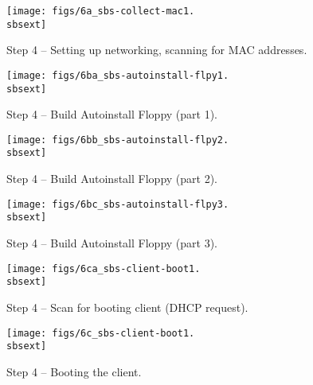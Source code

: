 
\begin{figure}[htbp]
  \begin{center}
    \texttt{[image: figs/6a\_sbs-collect-mac1.\\sbsext]}
    \caption{Step 4 -- Setting up networking, scanning for MAC addresses.}
    \label{fig:sbs-setup-network1}
  \end{center}
\end{figure}

\begin{figure}[htbp]
  \begin{center}
    \texttt{[image: figs/6ba\_sbs-autoinstall-flpy1.\\sbsext]}
    \caption{Step 4 -- Build Autoinstall Floppy (part 1).}
    \label{fig:sbs-autoinstall-flpy1}
  \end{center}
\end{figure}

\begin{figure}[htbp]
  \begin{center}
    \texttt{[image: figs/6bb\_sbs-autoinstall-flpy2.\\sbsext]}
    \caption{Step 4 -- Build Autoinstall Floppy (part 2).}
    \label{fig:sbs-autoinstall-flpy1}
  \end{center}
\end{figure}

\begin{figure}[htbp]
  \begin{center}
    \texttt{[image: figs/6bc\_sbs-autoinstall-flpy3.\\sbsext]}
    \caption{Step 4 -- Build Autoinstall Floppy (part 3).}
    \label{fig:sbs-autoinstall-flpy3}
  \end{center}
\end{figure}

\begin{figure}[htbp]
  \begin{center}
    \texttt{[image: figs/6ca\_sbs-client-boot1.\\sbsext]}
    \caption{Step 4 -- Scan for booting client (DHCP request).}
    \label{fig:sbs-collect-boot1}
  \end{center}
\end{figure}

\begin{figure}[htbp]
  \begin{center}
    \texttt{[image: figs/6c\_sbs-client-boot1.\\sbsext]}
    \caption{Step 4 -- Booting the client.}
    \label{fig:sbs-client-boot2}
  \end{center}
\end{figure}


